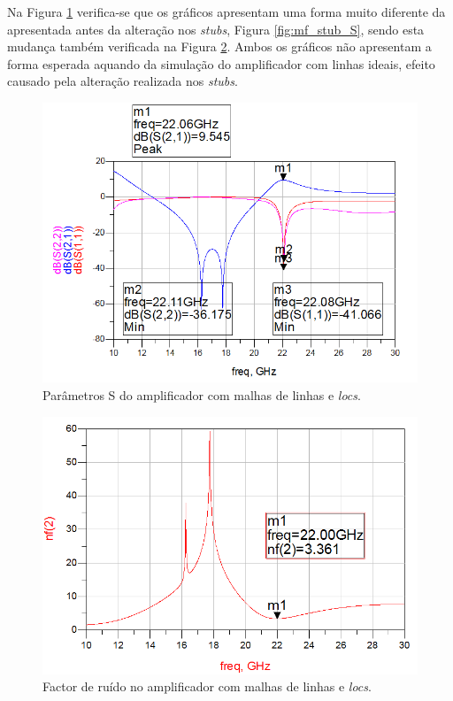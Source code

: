 \documentclass[11pt]{article}
\numberwithin{equation}{section}
\begin{document}
Na Figura \ref{fig:mf_S} verifica-se que os gráficos apresentam uma forma muito diferente da apresentada antes da alteração nos \textit{stubs}, Figura \ref{fig:mf_stub_S}, sendo esta mudança também verificada na Figura \ref{fig:mf_noise}. Ambos os gráficos não apresentam a forma esperada aquando da simulação do amplificador com linhas ideais, efeito causado pela alteração realizada nos \textit{stubs}.

\begin{figure}[H]
	\centering
	\includegraphics[keepaspectratio=true, scale=0.45]{exps/mf_S}
	\vspace{-0.5em}
	\caption{Parâmetros S do amplificador com malhas de linhas e \textit{locs}.}
	\vspace{-0.8em}
	\label{fig:mf_S}
\end{figure}

\begin{figure}[H]
	\centering
	\includegraphics[keepaspectratio=true, scale=0.45]{exps/mf_noise}
	\vspace{-0.5em}
	\caption{Factor de ruído no amplificador com malhas de linhas e \textit{locs}.}
	\vspace{-0.8em}
	\label{fig:mf_noise}
\end{figure}
\end{document}
